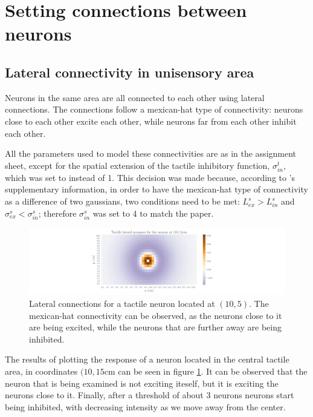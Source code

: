 \documentclass[12pt]{article}
\begin{document}
\section{Setting connections between neurons}

\subsection{Lateral connectivity in unisensory area}

Neurons in the same area are all connected to each other using lateral connections. The connections follow a mexican-hat type of connectivity: neurons close to each other excite each other, while neurons far from each other inhibit each other.

All the parameters used to model these connectivities are as in the assignment sheet, except for the spatial extension of the tactile inhibitory function, $\sigma_{in}^t$, which was set to instead of 1. This decision was made because, according to \cite{Serino2015}'s supplementary information, in order to have the mexican-hat type of connectivity as a difference of two gaussians, two conditions need to be met: $L_{ex}^s > L_{in}^s$ and $\sigma_{ex}^s < \sigma_{in}^s$; therefore $\sigma_{in}^s$ was set to 4 to match the paper.

\begin{figure}[h!]
	\centering
	\hspace*{-0.6in}
	\includegraphics[width=1.2\linewidth]{fig/3-2-1.png}
	\caption{Lateral connections for a tactile neuron located at $(10,5)$. The mexican-hat connectivity can be observed, as the neurons close to it are being excited, while the neurons that are further away are being inhibited.}
	\label{fig:3.2.1}
\end{figure}

The results of plotting the response of a neuron located in the central tactile area, in coordinates $(10,15$cm can be seen in figure \ref{fig:3.2.1}. It can be observed that the neuron that is being examined is not exciting iteself, but it is exciting the neurons close to it. Finally, after a threshold of about 3 neurons neurons start being inhibited, with decreasing intensity as we move away from the center.
\end{document}
